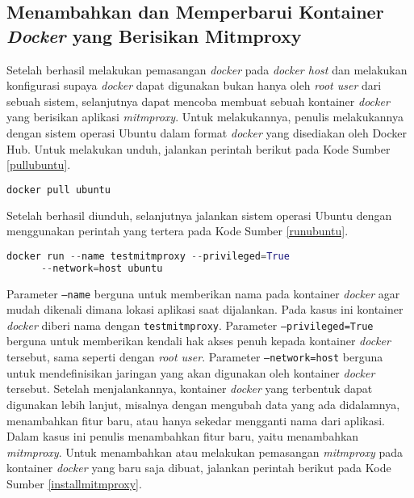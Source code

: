   \subsection{Menambahkan dan Memperbarui Kontainer \textit{Docker} yang Berisikan Mitmproxy}
  Setelah berhasil melakukan pemasangan \textit{docker} pada \textit{docker host} dan melakukan konfigurasi supaya \textit{docker} dapat digunakan bukan hanya oleh \textit{root user} dari sebuah sistem, selanjutnya dapat mencoba membuat sebuah kontainer \textit{docker} yang berisikan aplikasi \textit{mitmproxy}. Untuk melakukannya, penulis melakukannya dengan sistem operasi Ubuntu dalam format \textit{docker} yang disediakan oleh Docker Hub. Untuk melakukan unduh, jalankan perintah berikut pada Kode Sumber \ref{pullubuntu}.
  \newline
  \begin{minipage}{\linewidth}
  \begin{lstlisting}[caption=Perintah untuk \textit{Pull} Ubuntu,language=Python,label=pullubuntu]
  docker pull ubuntu
  \end{lstlisting}
  \end{minipage}
  Setelah berhasil diunduh, selanjutnya jalankan sistem operasi Ubuntu dengan menggunakan perintah yang tertera pada Kode Sumber \ref{runubuntu}.
  \newline
  \begin{minipage}{\linewidth}
  \begin{lstlisting}[caption=Perintah untuk Menjalankan \textit{Image} Ubuntu,language=Python,label=runubuntu]
  docker run --name testmitmproxy --privileged=True 
 	  --network=host ubuntu
  \end{lstlisting}
  \end{minipage}
	Parameter \texttt{--name} berguna untuk memberikan nama pada kontainer \textit{docker} agar mudah dikenali dimana lokasi aplikasi saat dijalankan. Pada kasus ini kontainer \textit{docker} diberi nama dengan \texttt{testmitmproxy}. Parameter \texttt{--privileged=True} berguna untuk memberikan kendali hak akses penuh kepada kontainer \textit{docker} tersebut, sama seperti dengan \textit{root user}. Parameter \texttt{--network=host} berguna untuk mendefinisikan jaringan yang akan digunakan oleh kontainer \textit{docker} tersebut. Setelah menjalankannya, kontainer \textit{docker} yang terbentuk dapat digunakan lebih lanjut, misalnya dengan mengubah data yang ada didalamnya, menambahkan fitur baru, atau hanya sekedar mengganti nama dari aplikasi.\\
	\indent Dalam kasus ini penulis menambahkan fitur baru, yaitu menambahkan \textit{mitmproxy}. Untuk menambahkan atau melakukan pemasangan \textit{mitmproxy} pada kontainer \textit{docker} yang baru saja dibuat, jalankan perintah berikut pada Kode Sumber \ref{installmitmproxy}.
